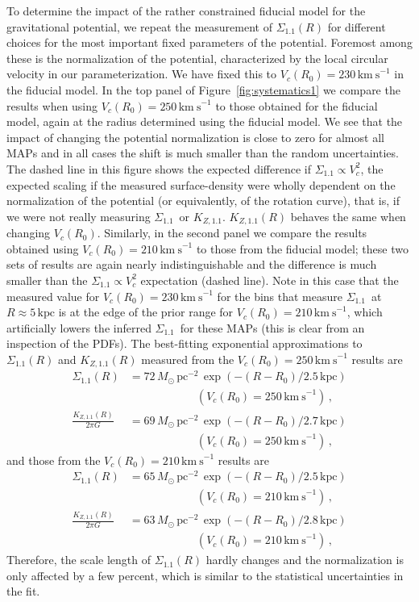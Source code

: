 \documentclass{emulateapj}
\renewcommand{\figurename}{Figure}
\newcommand{\map}{MAP}
\newcommand{\kpc}{\ensuremath{\,\mathrm{kpc}}}
\newcommand{\kms}{\ensuremath{\,\mathrm{km\ s}^{-1}}}
\newcommand{\sigoneone}{\ensuremath{\Sigma_{1.1}}}
\newcommand{\kzoneone}{\ensuremath{K_{Z,1.1}}}
\begin{document}
To determine the impact of the rather constrained fiducial model for
the gravitational potential, we repeat the measurement of
$\sigoneone(R)$ for different choices for the most important fixed
parameters of the potential. Foremost among these is the normalization
of the potential, characterized by the local circular velocity in our
parameterization. We have fixed this to $V_c(R_0) = 230\kms$ in the
fiducial model. In the top panel of \figurename~\ref{fig:systematics1}
we compare the results when using $V_c(R_0) = 250\kms$ to those
obtained for the fiducial model, again at the radius determined using
the fiducial model. We see that the impact of changing the potential
normalization is close to zero for almost all \map s and in all cases
the shift is much smaller than the random uncertainties. The dashed
line in this figure shows the expected difference if $\sigoneone
\propto V_c^2$, the expected scaling if the measured surface-density
were wholly dependent on the normalization of the potential (or
equivalently, of the rotation curve), that is, if we were not really
measuring \sigoneone\ or \kzoneone.  $\kzoneone(R)$ behaves the same
when changing $V_c(R_0)$.  Similarly, in the second panel we compare
the results obtained using $V_c(R_0) = 210\kms$ to those from the
fiducial model; these two sets of results are again nearly
indistinguishable and the difference is much smaller than the
$\sigoneone \propto V_c^2$ expectation (dashed line). Note in this
case that the measured value for $V_c(R_0) = 230\kms$ for the bins
that measure \sigoneone\ at $R \approx5\kpc$ is at the edge of the
prior range for $V_c(R_0) = 210\kms$, which artificially lowers the
inferred \sigoneone\ for these \map s (this is clear from an
inspection of the PDFs). The best-fitting exponential approximations
to $\sigoneone(R)$ and $\kzoneone(R)$ measured from the $V_c(R_0) =
250\kms$ results are
\begin{align}
  \sigoneone(R) & = 72\,M_\odot\,\mathrm{pc}^{-2}\,\exp\left(-(R-R_0)/ 2.5\kpc\right)\nonumber\\
  & \qquad \qquad \qquad (V_c(R_0) = 250\kms)\,,\\
  \frac{\kzoneone(R)}{2\pi G} & = 69\,M_\odot\,\mathrm{pc}^{-2}\,\exp\left(-(R-R_0)/ 2.7\kpc\right)\nonumber\\ & \qquad \qquad \qquad (V_c(R_0) = 250\kms)\,,
\end{align}
 and those from the $V_c(R_0) =210\kms$ results are
\begin{align}
  \sigoneone(R) & = 65\,M_\odot\,\mathrm{pc}^{-2}\,\exp\left(-(R-R_0)/ 2.5\kpc\right)\nonumber\\& \qquad \qquad \qquad (V_c(R_0) = 210\kms)\,,\\
  \frac{\kzoneone(R)}{2\pi G} & = 63\,M_\odot\,\mathrm{pc}^{-2}\,\exp\left(-(R-R_0)/ 2.8\kpc\right)\nonumber\\
  & \qquad \qquad \qquad (V_c(R_0) = 210\kms)\,,
\end{align}
Therefore, the scale length of $\sigoneone(R)$ hardly changes and the
normalization is only affected by a few percent, which is similar to
the statistical uncertainties in the fit.
\end{document}
